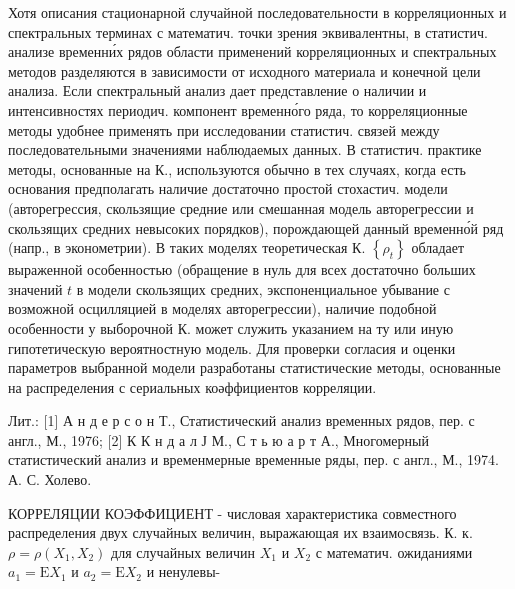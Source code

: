 \documentclass[10pt]{article}
\begin{document}
Хотя описания стационарной случайной последовательности в корреляционных и спектральных терминах с математич. точки зрения эквивалентны, в статистич. анализе временни́х рядов области применений корреляционных и спектральных методов разделяются в зависимости от исходного материала и конечной цели анализа. Если спектральный анализ дает представление о наличии и интенсивностях периодич. компонент временно́го ряда, то корреляционные методы удобнее применять при исследовании статистич. связей между последовательными значениями наблюдаемых данных. В статистич. практике методы, основанные на К., используются обычно в тех случаях, когда есть основания предполагать наличие достаточно простой стохастич. модели (авторегрессия, скользящие средние или смешанная модель авторегрессии и скользящих средних невысоких порядков), порождающей данный временно́й ряд (напр., в эконометрии). В таких моделях теоретическая К. $\left\{\rho_{t}\right\}$ обладает выраженной особенностью (обращение в нуль для всех достаточно больших значений $t$ в модели скользящих средних, экспоненциальное убывание с возможной осцилляцией в моделях авторегрессии), наличие подобной особенности у выборочной К. может служить указанием на ту или иную гипотетическую вероятностную модель. Для проверки согласия и оценки параметров выбранной модели разработаны статистические методы, основанные на распределения с сериальных коәффициентов корреляции.



Лит.: [1] А н д е р с о н Т., Статистический анализ временных рядов, пер. с англ., М., 1976; [2] К К н д а л Ј М., С т ь ю а р т А., Многомерный статистический анализ и временмерные временные ряды, пер. с англ., М., 1974. А. С. Холево.



КОРРЕЛЯЦИИ КОЭФФИЦИЕНТ - числовая характеристика совместного распределения двух случайных величин, выражающая их взаимосвязь. К. к. $\rho=\rho\left(X_{1}, X_{2}\right)$ для случайных величин $X_{1}$ и $X_{2}$ с математич. ожиданиями $a_{1}=\mathrm{E} X_{1}$ и $a_{2}=\mathrm{E} X_{2}$ и ненулевы-
\end{document}
